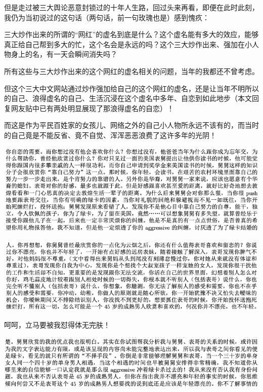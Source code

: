 \documentclass[9pt, b5paper]{article}
\begin{document}
但是走过被三大舆论恶意封锁过的十年人生路，回过头来再看，即便在此时此刻，我仍为当初说过的这句话（两句话，前一句玫瑰也是）感到愧疚：

三大炒作出来的所谓的“网红”的虚名到底是什么？这个虚名能有多大的效应，能够真正给自己帮到多大的忙，这个名会是永远的吗？这个三大炒作出来、强加在小人物身上的名，有一天会瞬间消失吗？

所有这些与三大炒作出来的这个网红的虚名相关的问题，当年的我都还不曾考虑。

但这个三大中文网站通过炒作强加给自己的这个网红的虚名，还是让当年不明所以的自己、浪得虚名的自己、生活沉浸在这个虚名中多年、自恋到如此地步（本文回复网友贴中已有两处明显展现了那浪得虚名的自恋）！

而这是作为平民百姓家的女孩儿、网络之外的自己小人物所永远不该有的，而当时的自己竟是不能反省、竟不自觉、浑浑恶恶浪费了这许多年的光阴！

\begin{center}
\includegraphics[width=.9\linewidth]{./pic/p1p109-4.png}
\end{center}

\begin{center}
\includegraphics[width=.9\linewidth]{./pic/p1p109-5.png}
\end{center}

呵呵，立马要被我怼得体无完肤！

\begin{center}
\includegraphics[width=.9\linewidth]{./pic/p1p114-4.png}
\end{center}
\end{document}
